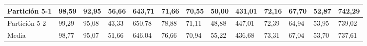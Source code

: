 \documentclass[10pt,a4paper]{article}
\begin{document}
\begin{table}[H]
{\begin{tabular}{|l|l|l|l|l|l|l|l|l|l|l|l|l|}
Partición 5-1                             & 98,59        & 92,95         & 56,66   & 643,71 & 71,66        & 70,55         & 50,00   & 431,01 & 72,16        & 67,70         & 52,87   & 742,29 \\ \hline
Partición 5-2                             & 99,29        & 95,08         & 43,33   & 650,78 & 78,88        & 71,11         & 48,88   & 447,01 & 72,39        & 64,94         & 53,95   & 739,02 \\ \hline
Media                                     & 98,77        & 95,07         & 51,66   & 646,04 & 76,66        & 70,94         & 55,22   & 436,68 & 73,31        & 67,04         & 53,70   & 737,61 \\ \hline
\end{tabular}}
\end{table}
\end{document}
